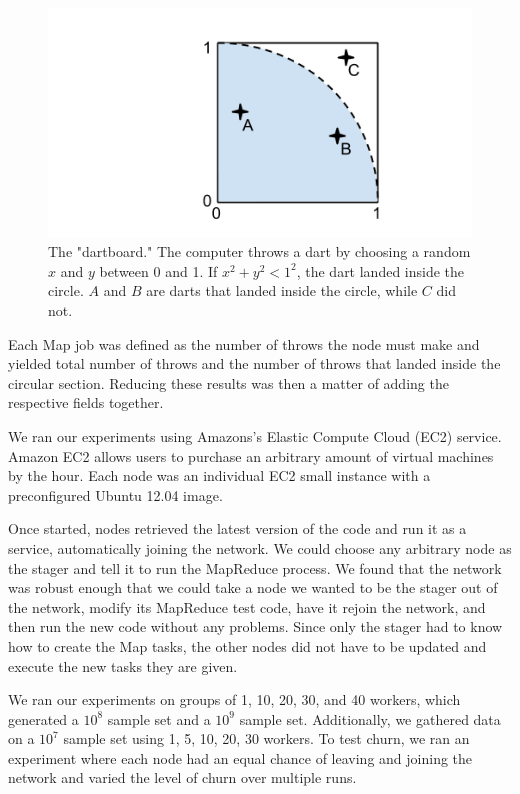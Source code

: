 \begin{figure}
	\centering
	\includegraphics[width=0.5\linewidth]{figs/dartboard}
	\caption{The "dartboard." The computer throws a dart by choosing a random $x$ and $y$ between 0 and 1.  If $x^{2} + y^{2} < 1^{2} $, the dart landed inside the circle.  $A$ and $B$ are darts that landed inside the circle, while $C$ did not.}
	\label{fig:dartboard}
\end{figure}


Each Map job was defined as the number of throws the node must make and yielded total number of throws and the number of throws that landed inside the circular section.  
Reducing these results was then a matter of adding the respective fields together. 

We ran our experiments using Amazons's Elastic Compute Cloud (EC2) service.  
Amazon EC2 allows users to purchase an arbitrary amount of virtual machines by the hour. 
Each node was an individual EC2 small instance with a preconfigured Ubuntu 12.04 image.  

Once started, nodes retrieved the latest version of the code and run it as a service, automatically joining the network.  
We could choose any arbitrary node as the stager and tell it to run the MapReduce process. 
We found that the network was robust enough that we could take a node we wanted to be the stager out of the network, modify its MapReduce test code, have it rejoin the network, and then run the new code without any problems. 
Since only the stager had to know how to create the Map tasks, the other nodes did not have to be updated and execute the new tasks they are given.

We ran our experiments on groups of 1, 10, 20, 30, and 40 workers, which generated a $10^{8}$ sample set and a $10^{9}$ sample set.
Additionally, we gathered data on a $10^{7}$ sample set using 1, 5, 10, 20, 30 workers.  
To test churn, we ran an experiment where each node had an equal chance of leaving and joining the network and varied the level of churn over multiple runs.  

